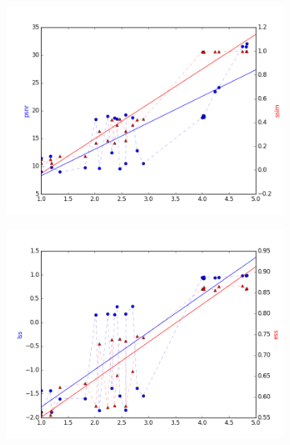 \documentclass{article}
\begin{document}
\begin{figure}[ht]
\centering
\begin{subfigure}{4.3cm}
  \centering
  \includegraphics[width=1\linewidth]{figures/mos_ssim}
  \caption{}
  \label{fig:sub1}
\end{subfigure}%
\begin{subfigure}{4.3cm}
  \centering
  \includegraphics[width=1\linewidth]{figures/mos_ess}
  \caption{}
  \label{fig:sub2}
\end{subfigure}
\begin{subfigure}{4.3cm}
  \centering

\end{subfigure}
\end{figure}
\end{document}
